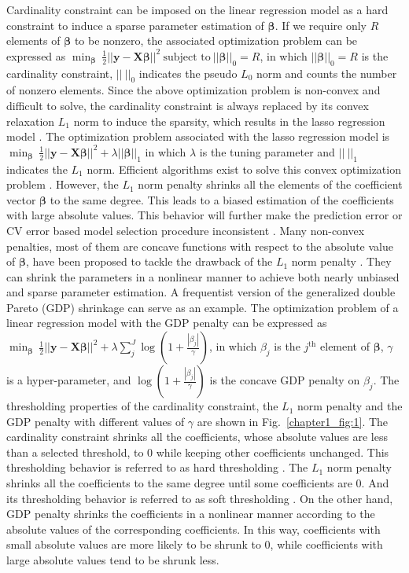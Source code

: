 Cardinality constraint can be imposed on the linear regression model as a hard constraint to induce a sparse parameter estimation of $\bm{\beta}$. If we require only $R$ elements of $\bm{\beta}$ to be nonzero, the associated optimization problem can be expressed as $\min_{\bm{\beta}} ~ \frac{1}{2}||\mathbf{y} - \mathbf{X}\bm{\beta}||^2 ~ \text{subject to} ~ ||\bm{\beta}||_0 = R$, in which $||\bm{\beta}||_0 = R$ is the cardinality constraint, $||~||_0$ indicates the pseudo $L_{0}$ norm and counts the number of nonzero elements. Since the above optimization problem is non-convex and difficult to solve, the cardinality constraint is always replaced by its convex relaxation $L_1$ norm to induce the sparsity, which results in the lasso regression model \cite{tibshirani1996regression}. The optimization problem associated with the lasso regression model is $\min_{\bm{\beta}} ~ \frac{1}{2}||\mathbf{y} - \mathbf{X}\bm{\beta}||^2 + \lambda ||\bm{\beta}||_1$ in which $\lambda$ is the tuning parameter and $||~||_1$ indicates the $L_{1}$ norm. Efficient algorithms exist to solve this convex optimization problem \cite{efron2004least,parikh2014proximal}. However, the $L_{1}$ norm penalty shrinks all the elements of the coefficient vector $\bm{\beta}$ to the same degree. This leads to a biased estimation of the coefficients with large absolute values. This behavior will further make the prediction error or CV error based model selection procedure inconsistent \cite{meinshausen2010stability}. Many non-convex penalties, most of them are concave functions with respect to the absolute value of $\bm{\beta}$, have been proposed to tackle the drawback of the $L_{1}$ norm penalty \cite{fan2001variable,armagan2013generalized}. They can shrink the parameters in a nonlinear manner to achieve both nearly unbiased and sparse parameter estimation. A frequentist version of the generalized double Pareto (GDP) \cite{armagan2013generalized} shrinkage can serve as an example. The optimization problem of a linear regression model with the GDP penalty can be expressed as $\min_{\bm{\beta}} ~ \frac{1}{2}||\mathbf{y} - \mathbf{X}\bm{\beta}||^2 + \lambda \sum_{j}^{J} \log(1+\frac{|\beta_j|}{\gamma})$, in which $\beta_j$ is the $j^{\text{th}}$ element of $\bm{\beta}$, $\gamma$ is a hyper-parameter, and $\log(1+\frac{|\beta_j|}{\gamma})$ is the concave GDP penalty on $\beta_j$. The thresholding properties of the cardinality constraint, the $L_{1}$ norm penalty and the GDP penalty with different values of $\gamma$ are shown in Fig.~\ref{chapter1_fig:1}. The cardinality constraint shrinks all the coefficients, whose absolute values are less than a selected threshold, to 0 while keeping other coefficients unchanged. This thresholding behavior is referred to as hard thresholding \cite{tibshirani1996regression}. The $L_{1}$ norm penalty shrinks all the coefficients to the same degree until some coefficients are 0. And its thresholding behavior is referred to as soft thresholding \cite{tibshirani1996regression}. On the other hand, GDP penalty shrinks the coefficients in a nonlinear manner according to the absolute values of the corresponding coefficients. In this way, coefficients with small absolute values are more likely to be shrunk to 0, while coefficients with large absolute values tend to be shrunk less.
